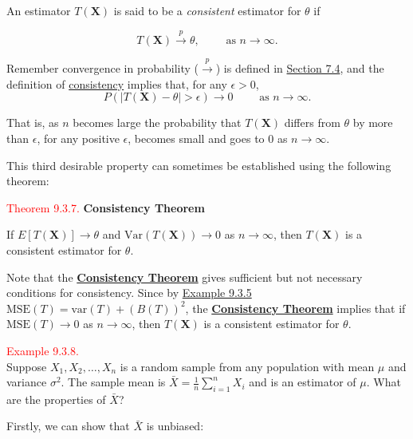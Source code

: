 \documentclass[
]{book}
\begin{document}
An estimator \(T(\mathbf{X})\) is said to be a \emph{consistent} estimator for \(\theta\) if

\[T(\mathbf{X}) \stackrel{p}{\longrightarrow} \theta, \qquad \text{ as } n \rightarrow \infty.\]

Remember convergence in probability (\(\stackrel{p}{\longrightarrow}\)) is defined in \protect\hyperlink{Sec_CLT:LLN}{Section 7.4}, and the definition of \protect\hyperlink{paraestimate:def:consistent}{consistency} implies that, for any \(\epsilon >0\),\\

\[ P (|T (\mathbf{X})- \theta|> \epsilon) \rightarrow 0 \qquad \text{ as } n \rightarrow \infty.\]

That is, as \(n\) becomes large the probability that \(T(\mathbf{X})\) differs from \(\theta\) by more than \(\epsilon\), for any positive \(\epsilon\), becomes small and goes to 0 as \(n \rightarrow \infty\).

This third desirable property can sometimes be established using the following theorem:

\leavevmode{}%
\textcolor{red}{Theorem 9.3.7.}
{\textbf{Consistency Theorem}}

If \(E \left[ T(\mathbf{X}) \right] \rightarrow \theta\) and \(\text{Var} \left( T(\mathbf{X}) \right) \rightarrow 0\) as \(n \rightarrow \infty\), then \(T(\mathbf{X})\) is a consistent estimator for \(\theta\).

Note that the \protect\hyperlink{paraestimate:thm:consistent_estimator_thm}{\textbf{Consistency Theorem}} gives sufficient but not necessary conditions for consistency. Since by \protect\hyperlink{paraesimate:exer:MSE}{Example 9.3.5} \(\text{MSE}(T) = \text{var} (T) + \left( B(T) \right)^2\), the \protect\hyperlink{paraestimate:thm:consistent_estimator_thm}{\textbf{Consistency Theorem}} implies that if \(\text{MSE}(T) \rightarrow 0\) as \(n \rightarrow \infty\), then \(T(\mathbf{X})\) is a consistent estimator for \(\theta\).

\leavevmode{}%
\textcolor{red}{Example 9.3.8.}\\
Suppose \(X_1,X_2,\ldots,X_n\) is a random sample from any population with mean \(\mu\) and variance \(\sigma^2\). The sample mean is \(\bar{X} = \frac{1}{n} \sum_{i=1}^n X_i\) and is an estimator of \(\mu\). What are the properties of \(\bar{X}\)?

Firstly, we can show that \(\bar{X}\) is unbiased:
\end{document}
